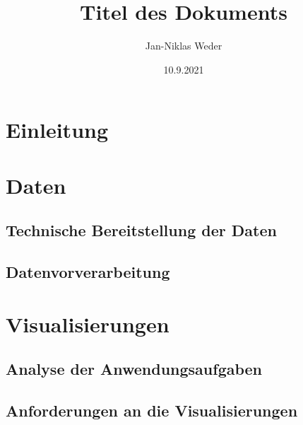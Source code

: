 \documentclass[usegeometry=true]{scrartcl}
\begin{document}
\subject{Projektbericht zum Modul Information Retrieval und Visualisierung Sommersemester 2021}
\title{Titel des Dokuments}
\author{Jan-Niklas Weder}%
\date{10.9.2021}
\begin{titlepage}
	\maketitle %
	\thispagestyle{empty} %
\end{titlepage}


\setcounter{tocdepth}{2}
\setcounter{secnumdepth}{1}
\tableofcontents

\clearpage
{}

\section{Einleitung}

\section{Daten}
\subsection{Technische Bereitstellung der Daten}
\subsection{Datenvorverarbeitung}
\section{Visualisierungen}
\subsection{Analyse der Anwendungsaufgaben}
\subsection{Anforderungen an die Visualisierungen}
\end{document}
